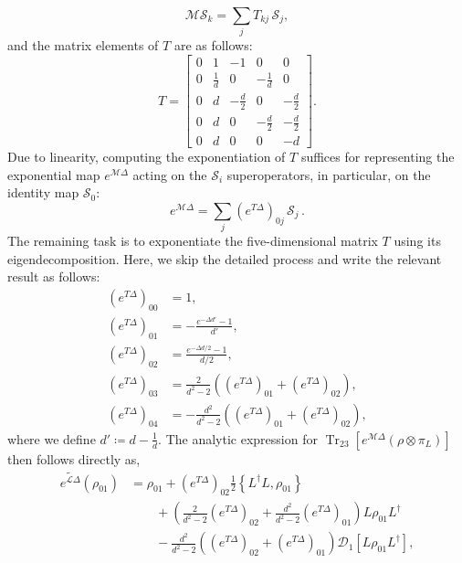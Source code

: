 \documentclass[superscriptaddress,amsmath,amssymb,aps,pra,letterpaper,tightenlines,notitlepages,12pt]{revtex4-2}
\begin{document}
\begin{equation}
\mathcal{M}\mathcal{S}_{k} = \sum_j T_{kj} \,\mathcal{S}_{j}  ,
\end{equation}
and the matrix elements of $T$ are as follows:
\begin{equation}
    T
    =
    \begin{bmatrix}
        0 & 1 & -1 & 0 & 0 \\
        0 & \frac{1}{d} & 0 & -\frac{1}{d} & 0 \\
        0 & d & -\frac{d}{2} & 0 & -\frac{d}{2} \\
        0 & d & 0 & -\frac{d}{2} & -\frac{d}{2} \\
        0 & d & 0 & 0 & -d
    \end{bmatrix}.
\end{equation}
Due to linearity, computing the exponentiation of $T$ suffices for representing the exponential map $e^{\mathcal{M}\Delta}$ acting on the $\mathcal{S}_i$ superoperators, in particular, on the identity map $\mathcal{S}_0$:
\begin{equation}
    e^{\mathcal{M}\Delta} = \sum_j (e^{T\Delta})_{0j}\,\mathcal{S}_j \, .
\end{equation}
The remaining task is to exponentiate the five-dimensional matrix $T$ using its eigendecomposition. Here, we skip the detailed process and write the relevant result as follows:
\begin{align}
    (e^{T\Delta})_{00} &= 1, \\
    (e^{T\Delta})_{01} &=-\frac{e^{-\Delta d'}-1}{d'}, \\
    (e^{T\Delta})_{02} &=\frac{e^{-\Delta d/2}-1}{d/2}, \\
    (e^{T\Delta})_{03} &=\frac{2}{d^2-2}\left((e^{T\Delta})_{01}+(e^{T\Delta})_{02}\right), \\
    (e^{T\Delta})_{04} &=-\frac{d^2}{d^2-2}\left((e^{T\Delta})_{01}+(e^{T\Delta})_{02}\right),
\end{align}
where we define $d'\coloneqq d-\tfrac{1}{d}$. The analytic expression for $\operatorname{Tr}_{23}[e^{\mathcal{M}\Delta}(\rho\otimes\pi_L)]$ then follows directly as,
\begin{align}
    \widetilde{e^{\mathcal{L}\Delta}}(\rho_{01})
    &=\rho_{01}  +(e^{T\Delta})_{02}\frac{1}{2}\left\{L^\dagger L, \rho_{01}\right\} \label{eq:tmp1} \\
    &\qquad +\left(\frac{2}{d^2-2}(e^{T\Delta})_{02}+\frac{d^2}{d^2-2}(e^{T\Delta})_{01}\right) L\rho_{01} L^\dagger \label{eq:tmp2} \\
    &\qquad - \frac{d^2}{d^2-2}\left((e^{T\Delta})_{02} + (e^{T\Delta})_{01}\right) \mathcal{D}_1[L\rho_{01}L^\dagger] ,\label{eq:tmp3}
\end{align}
\end{document}
